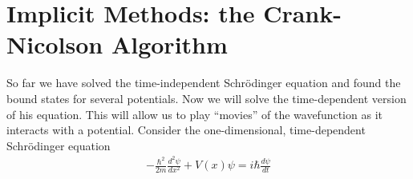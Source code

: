 \chapter[Implicit Methods: the Crank-Nicolson Algorithm]{Implicit Methods: the Crank-Nicolson Algorithm}
\label{ch:cn}

So far we have solved the time-independent Schr\"{o}dinger equation
and found the bound states for several potentials.  Now we will solve
the time-dependent version of his equation.  This will allow us to
play ``movies'' of the wavefunction as it interacts with a potential. 
Consider the one-dimensional, time-dependent Schr\"{o}dinger equation
\begin{align}
-\frac{\hbar^2}{2m} \frac{d^2\psi}{dx^2} + V(x) \psi = i \hbar \frac{d\psi}{dt}\label{eq:timeDep}
\end{align}
\vspace{0.25in}
